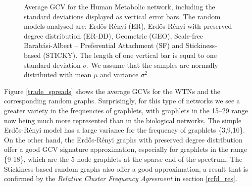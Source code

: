 \begin{figure}[H]
\begin{subfigure}[b]{1.0\textwidth}
  \end{subfigure}
  \caption[Average GCV for the Human Metabolic network and ER, ER-DD, GEO, SF and STICKY random models]{Average GCV for the Human Metabolic network, including the standard deviations displayed as vertical error bars. The random models analysed are: Erd\H{o}s-R\'{e}nyi (ER), Erd\H{o}s-R\'{e}nyi with preserved degree distribution (ER-DD), Geometric (GEO), Scale-free Barab\'{a}si-Albert -- Preferential Attachment (SF) and Stickiness-based (STICKY). The length of one vertical bar is equal to one standard deviation $\sigma$. We assume that the samples are normally distributed with mean $\mu$ and variance $\sigma^2$}
  \label{meta_spreads}
\end{figure}

Figure \ref{trade_spreads} shows the average GCVs for the WTNs and the corresponding random graphs. Surprisingly, for this type of networks we see a greater variety in the frequencies of graphlets, with graphlets in the 15--29 range now being much more represented than in the biological networks. The simple Erd\H{o}s-R\'{e}nyi model has a large variance for the frequency of graphlets \{3,9,10\}. On the other hand, the Erd\H{o}s-R\'{e}nyi graphs with preserved degree distribution offer a good GCV signature approximation, especially for graphlets in the range \{9-18\}, which are the 5-node graphlets at the sparse end of the spectrum. The Stickiness-based random graphs also offer a good approximation, a result that is confirmed by the \emph{Relative Cluster Frequency Agreement} in section \ref{rcfd_res}.

